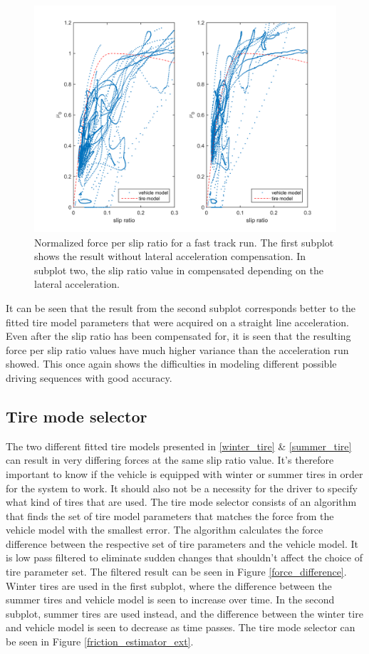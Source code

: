 \begin{figure}[h]
	\centering
	\includegraphics[width=1.0\textwidth]{Pictures/latacc_compensated}
	\caption {Normalized force per slip ratio for a fast track run. The first subplot shows the result without lateral acceleration compensation. In subplot two, the slip ratio value in compensated depending on the lateral acceleration.}
	\label{latacc_compensated}
\end{figure}

It can be seen that the result from the second subplot corresponds better to the fitted tire model parameters that were acquired on a straight line acceleration. Even after the slip ratio has been compensated for, it is seen that the resulting force per slip ratio values have much higher variance than the acceleration run showed. This once again shows the difficulties in modeling different possible driving sequences with good accuracy. 

\subsection{Tire mode selector}
The two different fitted tire models presented in \ref{winter_tire} \& \ref{summer_tire} can result in very differing forces at the same slip ratio value. It's therefore important to know if the vehicle is equipped with winter or summer tires in order for the system to work. It should also not be a necessity for the driver to specify what kind of tires that are used. The tire mode selector consists  of an algorithm that finds the set of tire model parameters that matches the force from the vehicle model with the smallest error. The algorithm calculates the force difference between the respective set of tire parameters and the vehicle model. It is low pass filtered to eliminate sudden changes that shouldn't affect the choice of tire parameter set. The filtered result can be seen in Figure \ref{force_difference}. Winter tires are used in the first subplot, where the difference between the summer tires and vehicle model is seen to increase over time. In the second subplot, summer tires are used instead, and the difference between the winter tire and vehicle model is seen to decrease as time passes. The tire mode selector can be seen in Figure \ref{friction_estimator_ext}.

